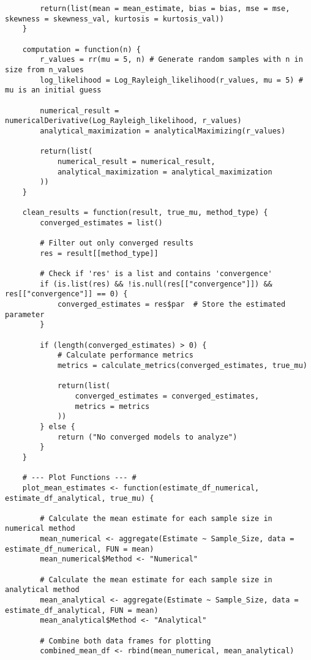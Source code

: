 \documentclass{report}
\begin{document}
\begin{verbatim}
        return(list(mean = mean_estimate, bias = bias, mse = mse, skewness = skewness_val, kurtosis = kurtosis_val))
    }
    
    computation = function(n) {
        r_values = rr(mu = 5, n) # Generate random samples with n in size from n_values
        log_likelihood = Log_Rayleigh_likelihood(r_values, mu = 5) # mu is an initial guess
    
        numerical_result = numericalDerivative(Log_Rayleigh_likelihood, r_values)
        analytical_maximization = analyticalMaximizing(r_values)
    
        return(list(
            numerical_result = numerical_result, 
            analytical_maximization = analytical_maximization
        ))
    }
    
    clean_results = function(result, true_mu, method_type) {
        converged_estimates = list()
    
        # Filter out only converged results
        res = result[[method_type]]
    
        # Check if 'res' is a list and contains 'convergence'
        if (is.list(res) && !is.null(res[["convergence"]]) && res[["convergence"]] == 0) {
            converged_estimates = res$par  # Store the estimated parameter
        }
      
        if (length(converged_estimates) > 0) {
            # Calculate performance metrics
            metrics = calculate_metrics(converged_estimates, true_mu)
    
            return(list(
                converged_estimates = converged_estimates,
                metrics = metrics
            ))
        } else {
            return ("No converged models to analyze")
        }
    }
    
    # --- Plot Functions --- #
    plot_mean_estimates <- function(estimate_df_numerical, estimate_df_analytical, true_mu) {
        
        # Calculate the mean estimate for each sample size in numerical method
        mean_numerical <- aggregate(Estimate ~ Sample_Size, data = estimate_df_numerical, FUN = mean)
        mean_numerical$Method <- "Numerical"
    
        # Calculate the mean estimate for each sample size in analytical method
        mean_analytical <- aggregate(Estimate ~ Sample_Size, data = estimate_df_analytical, FUN = mean)
        mean_analytical$Method <- "Analytical"
    
        # Combine both data frames for plotting
        combined_mean_df <- rbind(mean_numerical, mean_analytical)
        

\end{verbatim}
\end{document}
